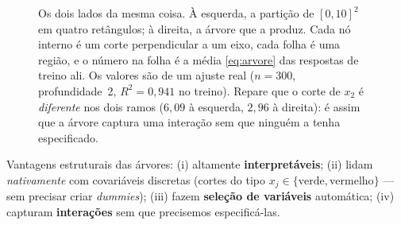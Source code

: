 \documentclass[11pt,a4paper]{article}
\begin{document}
\begin{figure}[htbp]
  \caption{Os dois lados da mesma coisa. À esquerda, a partição de $[0,10]^2$ em
  quatro retângulos; à direita, a árvore que a produz. Cada nó interno é um corte
  perpendicular a um eixo, cada folha é uma região, e o número na folha é a média
  \eqref{eq:arvore} das respostas de treino ali. Os valores são de um ajuste real
  ($n=300$, profundidade~2, $R^2=0{,}941$ no treino). Repare que o corte de
  $x_2$ é \emph{diferente} nos dois ramos ($6{,}09$ à esquerda, $2{,}96$ à direita):
  é assim que a árvore captura uma interação sem que ninguém a tenha especificado.}
  \label{fig:particao}
\end{figure}

\begin{ideia}
Vantagens estruturais das árvores: (i) altamente \textbf{interpretáveis};
(ii) lidam \emph{nativamente} com covariáveis discretas (cortes do tipo
$x_j\in\{\text{verde},\text{vermelho}\}$ --- sem precisar criar \emph{dummies});
(iii) fazem \textbf{seleção de variáveis} automática; (iv) capturam
\textbf{interações} sem que precisemos especificá-las.
\end{ideia}
\end{document}
